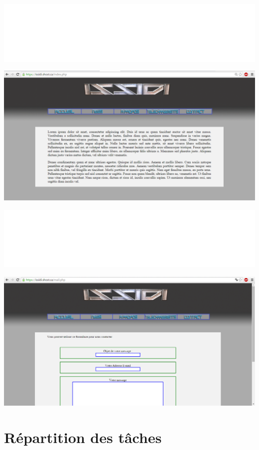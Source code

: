 ﻿\documentclass{article}
\begin{document}
\centerline{\includegraphics[scale=0.2]{latex_sa_pue.png}}
\centerline{\includegraphics[scale=0.4]{screen_site1v2.png}}
\centerline{\includegraphics[scale=0.2]{latex_sa_pue.png}}
\centerline{\includegraphics[scale=0.4]{screen_site2v2.png}}


\section{Répartition des tâches}
\end{document}

